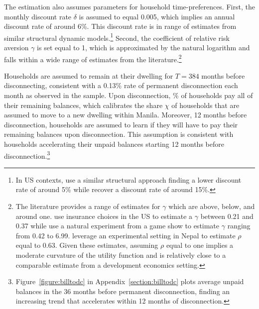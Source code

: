 \documentclass[12pt]{article}
\begin{document}
The estimation also assumes parameters for household time-preferences.  First, the monthly discount rate $\delta$ is assumed to equal 0.005, which implies an annual discount rate of around 6\%. This discount rate is in range of estimates from similar structural dynamic models.\footnote{In US contexts,\cite{gourinchas2002consumption} use a similar structural approach finding a lower discount rate of around 5\% while \cite{laibson2007estimating} recover a discount rate of around 15\%.}  Second, the coefficient of relative risk aversion $\gamma$ is set equal to 1, which is approximated by the natural logarithm and falls within a wide range of estimates from the literature.\footnote{The literature provides a range of estimates for $\gamma$ which are above, below, and around one.  \cite{barseghyan2013nature} use insurance choices in the US to estimate a $\gamma$ between 0.21 and 0.37 while  \cite{beetsma2001measuring} use a natural experiment from a game show to estimate $\gamma$ ranging from 0.42 to 6.99.  \cite{carvalho2016effect} leverage an experimental setting in Nepal to estimate $\rho$ equal to 0.63.  Given these estimates, assuming $\rho$ equal to one implies a moderate curvature of the utility function and is relatively close to a comparable estimate from a development economics setting.}

Households are assumed to remain at their dwelling for $T=384$ months before disconnecting, consistent with a 0.13\% rate of permanent disconnection each month as observed in the sample.  Upon disconnection, \unskip\% of households pay all of their remaining balances, which calibrates the share $\chi$ of households that are assumed to move to a new dwelling within Manila.  Moreover, 12 months before disconnection, households are assumed to learn if they will have to pay their remaining balances upon disconnection.  This assumption is consistent with households accelerating their unpaid balances starting 12 months before disconnection.\footnote{Figure~\ref{figure:billtodc} in Appendix~\ref{section:billtodc} plots average unpaid balances in the 36 months before permanent disconnection, finding an increasing trend that accelerates within 12 months of disconnection.}
\end{document}
